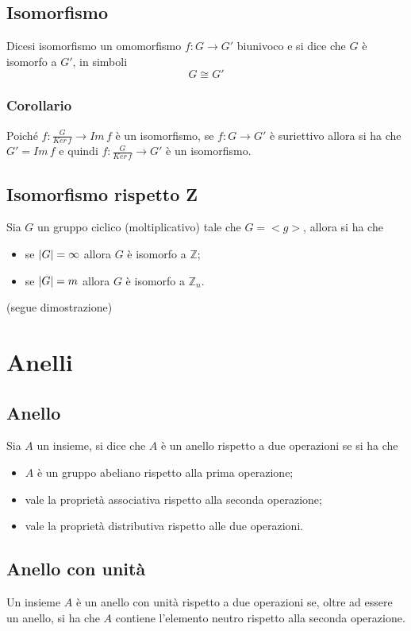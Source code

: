 \begin{flushleft}
\subsection{Isomorfismo}
Dicesi isomorfismo un omomorfismo $f:G\to G'$ biunivoco e si dice che $G$ è isomorfo a $G'$, in simboli
\[G \cong G'\]

\subsubsection{Corollario}
Poiché $f:\frac{G}{Ker\,f}\to Im\,f$ è un isomorfismo, se $f:G\to G'$ è suriettivo allora si ha che
$G' = Im\,f$ e quindi $f:\frac{G}{Ker\,f}\to G'$ è un isomorfismo.

\subsection{Isomorfismo rispetto Z}
Sia $G$ un gruppo ciclico (moltiplicativo) tale che $G=<g>$, allora si ha che
\begin{itemize}
    \item se $\abs{G} = \infty$ allora $G$ è isomorfo a $\mathbb{Z}$;
    \item se $\abs{G} = m$ allora $G$ è isomorfo a $\mathbb{Z}_n$.
\end{itemize}
(segue dimostrazione)
\\ \vspace{300px}



\section{Anelli}
\subsection{Anello}
Sia $A$ un insieme, si dice che $A$ è un anello rispetto a due operazioni se si ha che
\begin{itemize}
    \item $A$ è un gruppo abeliano rispetto alla prima operazione;
    \item vale la proprietà associativa rispetto alla seconda operazione;
    \item vale la proprietà distributiva rispetto alle due operazioni.
\end{itemize}


\subsection{Anello con unità}
Un insieme $A$ è un anello con unità rispetto a due operazioni se, oltre ad essere un anello, si ha che $A$ contiene l'elemento neutro rispetto alla seconda operazione.



\end{flushleft}
